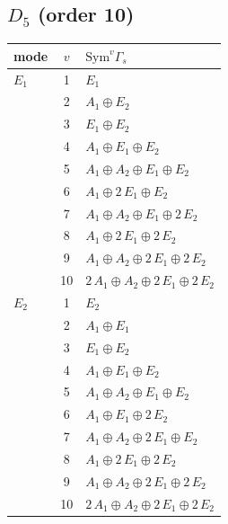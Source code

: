 \documentclass[11pt]{article}
\begin{document}
\subsection*{$D_{5}$ \quad (order 10)}
\begin{longtable}{l c p{}}
\hline mode & $v$ & $\mathrm{Sym}^v\Gamma_s$\\ \hline\endhead
$E_{1}$ & 1 & $E_{1}$\\
 & 2 & $A_{1}\oplus E_{2}$\\
 & 3 & $E_{1}\oplus E_{2}$\\
 & 4 & $A_{1}\oplus E_{1}\oplus E_{2}$\\
 & 5 & $A_{1}\oplus A_{2}\oplus E_{1}\oplus E_{2}$\\
 & 6 & $A_{1}\oplus 2\,E_{1}\oplus E_{2}$\\
 & 7 & $A_{1}\oplus A_{2}\oplus E_{1}\oplus 2\,E_{2}$\\
 & 8 & $A_{1}\oplus 2\,E_{1}\oplus 2\,E_{2}$\\
 & 9 & $A_{1}\oplus A_{2}\oplus 2\,E_{1}\oplus 2\,E_{2}$\\
 & 10 & $2\,A_{1}\oplus A_{2}\oplus 2\,E_{1}\oplus 2\,E_{2}$\\
\hline
$E_{2}$ & 1 & $E_{2}$\\
 & 2 & $A_{1}\oplus E_{1}$\\
 & 3 & $E_{1}\oplus E_{2}$\\
 & 4 & $A_{1}\oplus E_{1}\oplus E_{2}$\\
 & 5 & $A_{1}\oplus A_{2}\oplus E_{1}\oplus E_{2}$\\
 & 6 & $A_{1}\oplus E_{1}\oplus 2\,E_{2}$\\
 & 7 & $A_{1}\oplus A_{2}\oplus 2\,E_{1}\oplus E_{2}$\\
 & 8 & $A_{1}\oplus 2\,E_{1}\oplus 2\,E_{2}$\\
 & 9 & $A_{1}\oplus A_{2}\oplus 2\,E_{1}\oplus 2\,E_{2}$\\
 & 10 & $2\,A_{1}\oplus A_{2}\oplus 2\,E_{1}\oplus 2\,E_{2}$\\
\hline
\end{longtable}
\end{document}
